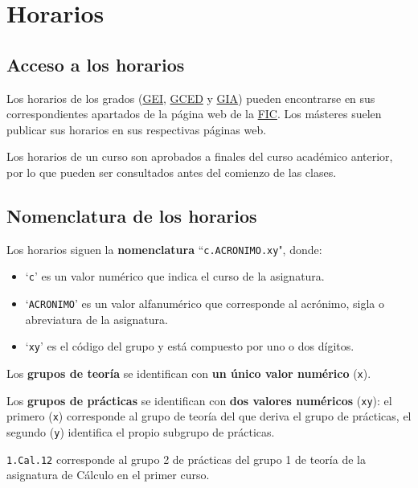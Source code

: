 \chapter{Horarios}

\section{Acceso a los horarios}

Los horarios de los grados (\href{\linkCalendarGEI}{\acrshort{GEI}}, \href{\linkCalendarGCED}{\acrshort{GCED}} y \href{\linkCalendarGIA}{\acrshort{GIA}}) pueden encontrarse en sus correspondientes apartados de la página web de la \href{\linkFIC}{\acrshort{FIC}}. Los másteres suelen publicar sus horarios en sus respectivas páginas web.

\begin{curiosityBox}
    Los horarios de un curso son aprobados a finales del curso académico anterior, por lo que pueden ser consultados antes del comienzo de las clases.
\end{curiosityBox}


\section{Nomenclatura de los horarios}

Los horarios siguen la \textbf{nomenclatura}  ``\texttt{c.ACRONIMO.xy}", donde:
\begin{itemize}
    \item `\texttt{c}' es un valor numérico que indica el curso de la asignatura.
    
    \item `\texttt{ACRONIMO}' es un valor alfanumérico que corresponde al acrónimo, sigla o abreviatura de la asignatura.
    
    \item `\texttt{xy}' es el código del grupo y está compuesto por uno o dos dígitos.
\end{itemize}

Los \textbf{grupos de teoría} se identifican con \textbf{un único valor numérico} (\texttt{x}).

Los \textbf{grupos de prácticas} se identifican con \textbf{dos valores numéricos} (\texttt{xy}): el primero (\texttt{x}) corresponde al grupo de teoría del que deriva el grupo de prácticas, el segundo (\texttt{y}) identifica el propio subgrupo de prácticas.

\begin{exampleBox}
    \texttt{1.Cal.12} corresponde al grupo 2 de prácticas del grupo 1 de teoría de la asignatura de Cálculo en el primer curso.
\end{exampleBox}

